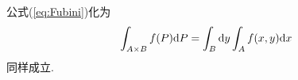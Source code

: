\begin{note}
	公式(\ref{eq:Fubini})化为
	\begin{equation}
		\int_{A \times B} f(P) \mathrm{d} P = \int_B \mathrm{d} y \int_A f(x,y) \mathrm{d} x
	\end{equation}
	同样成立. 
\end{note}
















